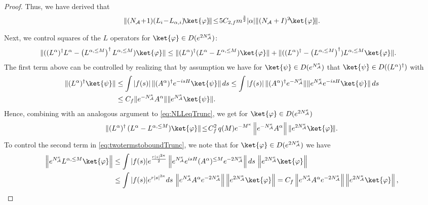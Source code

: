 \documentclass[11pt]{amsart}
\newcommand{\nn}{\nonumber}
\newcommand{\1}{\mathbbm{1}}
\newcommand{\NA}{N_{\mathcal{A}}}
\renewcommand{\phi}{\varphi}
\newcommand{\bin}[1]{}
\theoremstyle{plain}
\theoremstyle{definition}
\theoremstyle{remark}
\numberwithin{equation}{section}
\begin{document}
\begin{proof}
{Thus, we have derived that
\begin{align}
\|(\NA\!+\!1)(L_{i}\!-\!L_{\alpha,i})\!\ket{\varphi}\!\|\!\le\! 5C_{2,f}m^{\frac{3}{2}}|\alpha|\|(\NA+I)^2\!\ket{\varphi}\!\|.
\end{align}}

\bin{Similarly, denoting $L^{\alpha}^d:=\int f(s)e^{isH}a_i^\dagger e^{-isH}ds$ and $L_{\alpha,i}^d:=\int f(s)e^{isH}(a_{\alpha}^{Dd})_i e^{-isH}ds$, we get
\begin{align}\label{eq:NLLeqd}
\|(\NA\!+\!1)(L^d_{i}\!-\!L^d_{\alpha,i})\!\ket{\varphi}\!\|\!\le\! 5C_{2,f}m^{\frac{3}{2}}|\alpha|\|(\NA+I)^2\!\ket{\varphi}\!\|.
\end{align}}
Next, we control squares of the $L$ operators for $\ket{\varphi}\in D(e^{2\NA^{\kappa}})$:
\begin{align}\label{eq:twotermstoboundTrunc}
\|((L^\alpha)^\dagger L^{\alpha}-\left(L^{\alpha,\le M}\right)^\dagger L^{\alpha,\le M})\ket{\varphi}\|&\le \|(L^\alpha)^\dagger (L^{\alpha}-L^{\alpha,\le M})\ket{\varphi}\|+\|((L^\alpha)^\dagger-\left(L^{\alpha,\le M}\right)^\dagger)L^{\alpha,\le M}\ket{\varphi}\|.
\end{align}
The first term above can be controlled by realizing that by assumption we have for $\ket{\psi}\in D(e^{\NA^{\kappa}})$ that $\ket{\psi}\in D((L^\alpha)^\dagger)$ with
\begin{align}\label{eq:LiboundTrunc}
\|(L^\alpha)^\dagger\ket{\psi}\|&\le \int |f(s)|\,\|(A^{\alpha})^\dagger e^{-isH}\ket{\psi}\|\,ds\le \int |f(s)|\,\|(A^{\alpha})^\dagger e^{-\NA^{\kappa}}\|\| e^{\NA^{\kappa}}e^{-isH}\ket{\psi}\|\,ds\nn\\&
\le C_f \|e^{-\NA^{\kappa}}A^{\alpha}\| \|e^{\NA^{\kappa}}\ket{\psi}\|. 
\end{align}
Hence, combining with an analogous argument to \eqref{eq:NLLeqTrunc}, we get
for $\ket{\phi}\in D(e^{2\NA^{\kappa}})$
\begin{align}\label{eq:firstboundLLTrunc}
\|(L^\alpha)^\dagger\, (L^{\alpha}-L^{\alpha,\le M})\ket{\varphi}\|\!\le \! C^2_f\,q(M)e^{-M^\kappa}\left\|e^{-\NA^{\kappa}}A^{\alpha}\right\|\|e^{2\NA^{\kappa}}\ket{\varphi}\!\|.
\end{align}
To control the second term in \eqref{eq:twotermstoboundTrunc}, we note that for $\ket{\phi}\in D(e^{2\NA^{\kappa}})$ we have
\begin{align*}
    \left\|e^{\NA^{\kappa}}L^{\alpha,\le M} \ket{\phi}\right\| &\le  \int |f(s)|e^{\frac{r|s|^{2\kappa}}{2}} \left\|e^{\NA^{\kappa}}e^{isH}(A^{\alpha})^{\le M}e^{-2\NA^{\kappa}}\right\|ds\,\left\|e^{2\NA^{\kappa}}\ket{\phi}\right\| \\ &\le \int |f(s)| e^{r|s|^{2\kappa}} ds \,\left\|e^{\NA^{\kappa}}A^{\alpha}e^{-2\NA^{\kappa}}\right\|\left\|e^{2\NA^{\kappa}}\ket{\phi}\right\|= C_f  \left\|e^{\NA^{\kappa}}A^{\alpha}e^{-2\NA^{\kappa}}\right\|\left\|e^{2\NA^{\kappa}}\ket{\phi}\right\|,

\end{align*}
\end{proof}
\end{document}
